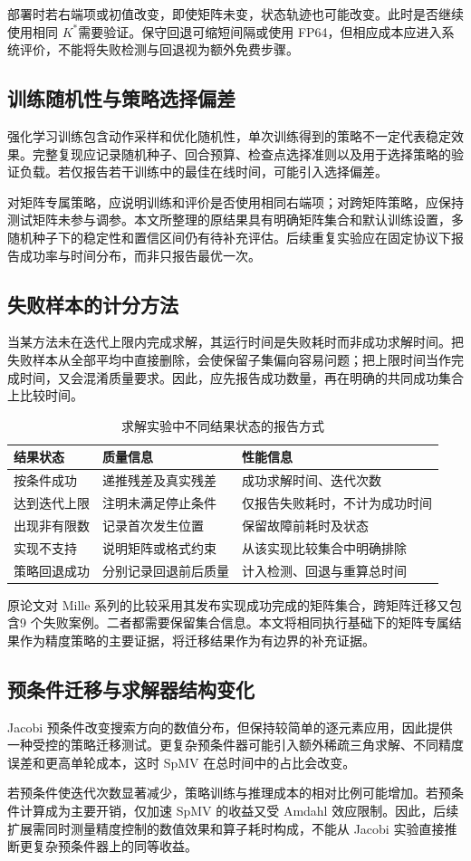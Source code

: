 部署时若右端项或初值改变，即使矩阵未变，状态轨迹也可能改变。此时是否继续使用相同 $K^*$需要验证。保守回退可缩短间隔或使用 FP64，但相应成本应进入系统评价，不能将失败检测与回退视为额外免费步骤。

\subsection{训练随机性与策略选择偏差}
强化学习训练包含动作采样和优化随机性，单次训练得到的策略不一定代表稳定效果。完整复现应记录随机种子、回合预算、检查点选择准则以及用于选择策略的验证负载。若仅报告若干训练中的最佳在线时间，可能引入选择偏差。

对矩阵专属策略，应说明训练和评价是否使用相同右端项；对跨矩阵策略，应保持测试矩阵未参与调参。本文所整理的原结果具有明确矩阵集合和默认训练设置，多随机种子下的稳定性和置信区间仍有待补充评估。后续重复实验应在固定协议下报告成功率与时间分布，而非只报告最优一次。

\subsection{失败样本的计分方法}
当某方法未在迭代上限内完成求解，其运行时间是失败耗时而非成功求解时间。把失败样本从全部平均中直接删除，会使保留子集偏向容易问题；把上限时间当作完成时间，又会混淆质量要求。因此，应先报告成功数量，再在明确的共同成功集合上比较时间。

\begin{table}[htbp]\centering\caption{求解实验中不同结果状态的报告方式}
\begin{tabularx}{\textwidth}{p{2.8cm}XX}\toprule
结果状态&质量信息&性能信息\\\midrule
按条件成功&递推残差及真实残差&成功求解时间、迭代次数\\
达到迭代上限&注明未满足停止条件&仅报告失败耗时，不计为成功时间\\
出现非有限数&记录首次发生位置&保留故障前耗时及状态\\
实现不支持&说明矩阵或格式约束&从该实现比较集合中明确排除\\
策略回退成功&分别记录回退前后质量&计入检测、回退与重算总时间\\\bottomrule
\end{tabularx}\end{table}

原论文对 Mille 系列的比较采用其发布实现成功完成的矩阵集合，跨矩阵迁移又包含9 个失败案例。二者都需要保留集合信息。本文将相同执行基础下的矩阵专属结果作为精度策略的主要证据，将迁移结果作为有边界的补充证据。

\subsection{预条件迁移与求解器结构变化}
Jacobi 预条件改变搜索方向的数值分布，但保持较简单的逐元素应用，因此提供一种受控的策略迁移测试。更复杂预条件器可能引入额外稀疏三角求解、不同精度误差和更高单轮成本，这时 SpMV 在总时间中的占比会改变。

若预条件使迭代次数显著减少，策略训练与推理成本的相对比例可能增加。若预条件计算成为主要开销，仅加速 SpMV 的收益又受 Amdahl 效应限制。因此，后续扩展需同时测量精度控制的数值效果和算子耗时构成，不能从 Jacobi 实验直接推断更复杂预条件器上的同等收益。
